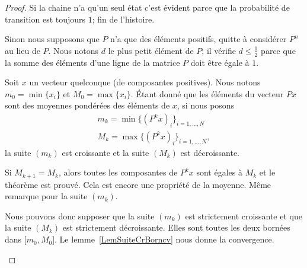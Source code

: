 \begin{proof}
	Si la chaine n'a qu'un seul état c'est évident parce que la probabilité de transition est toujours \( 1\); fin de l'histoire.

	\begin{subproof}
		\spitem[Hypothèse]

		Sinon nous supposons que \( P\) n'a que des éléments positifs, quitte à considérer \( P^n\) au lieu de \( P\). Nous notons \( d\) le plus petit élément de \( P\); il vérifie \( d\leq \frac{ 1 }{2}\) parce que la somme des éléments d'une ligne de la matrice \( P\) doit être égale à \( 1\).


		Soit \( x\) un vecteur quelconque (de composantes positives). Nous notons \( m_0=\min\{ x_i \}\) et \( M_0=\max\{ x_i \}\). Étant donné que les éléments du vecteur \( Px\) sont des moyennes pondérées des éléments de \( x\), si nous posons
		\begin{subequations}
			\begin{align}
				m_k=\min\{ (P^kx)_i \}_{i=1,\ldots, N} \\
				M_k=\max\{ (P^kx)_i \}_{i=1,\ldots, N},
			\end{align}
		\end{subequations}
		la suite \( (m_k)\) est croissante et la suite \( (M_k)\) est décroissante.


		Si \( M_{k+1}=M_k\), alors toutes les composantes de \( P^kx\) sont égales à \( M_k\) et le théorème est prouvé. Cela est encore une propriété de la moyenne. Même remarque pour la suite \( (m_k)\).

		Nous pouvons donc supposer que la suite \( (m_k)\) est strictement croissante et que la suite \( (M_k)\) est strictement décroissante. Elles sont toutes les deux bornées dans \( \mathopen[ m_0 , M_0 \mathclose]\). Le lemme~\ref{LemSuiteCrBorncv} nous donne la convergence.



\end{subproof}
\end{proof}
